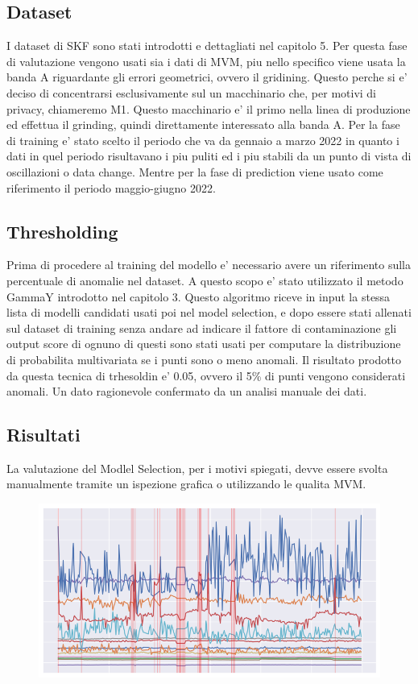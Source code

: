 \subsection{Dataset}
I dataset di SKF sono stati introdotti e dettagliati nel capitolo 5. Per questa fase di valutazione vengono usati sia i dati di MVM, piu nello specifico viene usata la banda A riguardante gli errori geometrici, ovvero il gridining. Questo perche si e' deciso di concentrarsi esclusivamente sul un macchinario che, per motivi di privacy, chiameremo M1. Questo macchinario e' il primo nella linea di produzione ed effettua il grinding, quindi direttamente interessato alla banda A.
Per la fase di training e' stato scelto il periodo che va da gennaio a marzo 2022 in quanto i dati in quel periodo risultavano i piu puliti ed i piu stabili da un punto di vista di oscillazioni o data change. Mentre per la fase di prediction viene usato come riferimento il periodo maggio-giugno 2022.


\subsection{Thresholding}
Prima di procedere al training del modello e' necessario avere un riferimento sulla percentuale di anomalie nel dataset. A questo scopo e' stato utilizzato il metodo GammaY introdotto nel capitolo 3.
Questo algoritmo riceve in input la stessa lista di modelli candidati usati poi nel model selection, e dopo essere stati allenati sul dataset di training senza andare ad indicare il fattore di contaminazione gli output score di ognuno di questi sono stati usati per computare la distribuzione di probabilita multivariata se i punti sono o meno anomali.
Il risultato prodotto da questa tecnica di trhesoldin e' 0.05, ovvero il 5\% di punti vengono considerati anomali. Un dato ragionevole confermato da un analisi manuale dei dati.
\subsection{Risultati}
La valutazione del Modlel Selection, per i motivi spiegati, devve essere svolta manualmente tramite un ispezione grafica o utilizzando le qualita MVM.


\begin{figure}[t]
\includegraphics[width=14cm, scale=1]{images/kde}
\centering
\end{figure}


